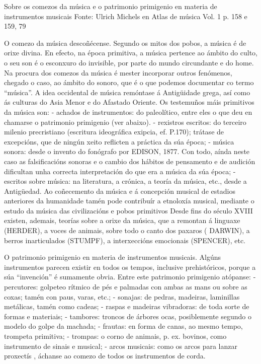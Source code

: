 %

Sobre os comezos da música e o patrimonio primigenio en materia de instrumentos musicais
Fonte: Ulrich Michels en Atlas de música Vol. 1 p. 158 e 159, 79


 O comezo da música descoñécense. Segundo os mitos dos pobos, a música é de orixe divina. En efecto, na época primitiva, a música pertence ao ámbito do culto, o seu son é o esconxuro do invisible, por parte do mundo circundante e do home. Na procura dos comezos da música é mester incorporar outros fenómenos, chegado o caso, ao ámbito do sonoro, que é o que podemos documentar co termo “música”. A idea occidental de música remóntase á Antigüidade grega, así como ás culturas do Asia Menor e do Afastado Oriente.
Os testemuños máis primitivos da música son:
-   achados de instrumentos: do paleolítico, entre eles o que deu en chamarse o patrimonio primigenio (ver abaixo).
-      rexistros escritos: do terceiro milenio precristiano (escritura ideográfica exipcia, ef. P.170); trátase de excepcións, que de ningún xeito reflicten a práctica da súa época;
-     música sonora: desde o invento do fonógrafo por EDISON, 1877. Con todo, aínda neste caso as falsificacións sonoras e o cambio dos hábitos de pensamento e de audición dificultan unha correcta interpretación do que era a música da súa época;
-      escritos sobre música: na literatura, a crónica, a teoría da música, etc., desde a Antigüedad.
Ao coñecemento da música e á concepción musical de estadios anteriores da humanidade tamén pode contribuír a etnoloxía musical, mediante o estudo da música das civilizacións e pobos primitivos
Desde fins do século XVIII existen, ademais, teorías sobre a orixe da música, que a remontan á linguaxe (HERDER), a voces de animais, sobre todo o canto dos paxaros (
DARWIN), a berros inarticulados (STUMPF), a interxeccións emocionais (SPENCER), etc.

 O patrimonio primigenio en materia  de instrumentos musicais.
Algúns instrumentos parecen existir en todos os tempos, inclusive prehistóricos, porque a súa “invención” é sumamente obvia. Entre este patrimonio primigenio atópanse:
-         percutores: golpeteo rítmico de pés e palmadas con ambas as mans ou sobre as coxas; tamén con paus, varas, etc.;
-         sonajas: de pedras, madeiras, laminillas metálicas, tamén como cadeas;
-         raspas e madeiras vibradoras: de toda sorte de formas e materiais;
-         tambores: troncos de árbores ocas, posiblemente segundo o modelo do golpe da machada;
-         frautas: en forma de canas, ao mesmo tempo, trompeta primitiva;
-         trompas: o corno de animais, p. ex. bovinos, como instrumento de sinais e musical;
-         arcos musicais: como os arcos para lanzar proxectís , áchanse ao comezo de todos os instrumentos de corda.

